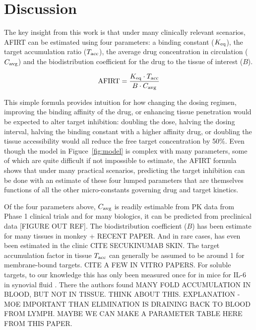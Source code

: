\section{Discussion}

The key insight from this work is that under many clinically relevant scenarios, AFIRT can be estimated using four parameters: a binding constant ($K_\text{eq}$), the target accumulation ratio ($T_\text{acc}$), the average drug concentration in circulation ($C_\text{avg}$) and the biodistribution coefficient for the drug to the tissue of interest ($B$).  

\begin{equation}
	\text{AFIRT} = \frac{K_\text{eq} \cdot T_\text{acc}}{B \cdot C_\text{avg}}
\end{equation}

This simple formula provides intuition for how changing the dosing regimen, improving the binding affinity of the drug, or enhancing tissue penetration would be expected to alter target inhibition: doubling the dose, halving the dosing interval, halving the binding constant with a higher affinity drug, or doubling the tissue accessibility would all reduce the free target concentration by 50\%.  Even though the model in Figuce~\ref{fig:model} is complex with many parameters, some of which are quite difficult if not impossible to estimate, the AFIRT formula shows that under many practical scenarios, predicting the target inhibition can be done with an estimate of these four lumped parameters that are themselves functions of all the other micro-constants governing drug and target kinetics.

Of the four parameters above, $C_\text{avg}$ is readily estimable from PK data from Phase 1 clinical trials and for many biologics, it can be predicted from preclinical data [FIGURE OUT REF].  The biodistribution coefficient ($B$) has been estimate for many tissues in monkey \cite{shah13} + RECENT PAPER.  And in rare cases, has even been estimated in the clinic CITE SECUKINUMAB SKIN.  The target accumulation factor in tissue $T_\text{acc}$ can generally be assumed to be around 1 for membrane-bound targets.  CITE A FEW IN VITRO PAPERS.  For soluble targets, to our knowledge this has only been measured once for in mice for IL-6 in synovial fluid \cite{chen16}.  There the authors found MANY FOLD ACCUMULATION IN BLOOD, BUT NOT IN TISSUE.  THINK ABOUT THIS.  EXPLANATION - MOE IMPORTANT THAN ELIMINATION IS DRAINING BACK TO BLOOD FROM LYMPH.  MAYBE WE CAN MAKE A PARAMETER TABLE HERE FROM THIS PAPER.

